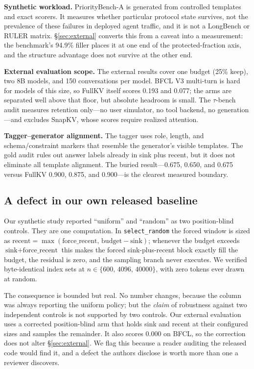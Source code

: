 \documentclass[10pt]{article}
\begin{document}
\textbf{Synthetic workload.}
PriorityBench-A is generated from controlled templates and exact scorers.  It
measures whether particular protocol state survives, not the prevalence of
these failures in deployed agent traffic, and it is not a LongBench or RULER
matrix.  \S\ref{sec:external} converts this from a caveat into a measurement:
the benchmark's 94.9\% filler places it at one end of the protected-fraction
axis, and the structure advantage does not survive at the other end.

\textbf{External evaluation scope.}
The external results cover one budget (25\% keep), two 8B models, and 150
conversations per model.  BFCL V3 multi-turn is hard for models of this size, so
FullKV itself scores 0.193 and 0.077; the arms are separated well above that
floor, but absolute headroom is small.  The $\tau$-bench audit measures retention
only---no user simulator, no tool backend, no generation---and excludes SnapKV,
whose scores require realized attention.

\textbf{Tagger--generator alignment.}
The tagger uses role, length, and schema/constraint markers that resemble the
generator's visible templates.  The gold audit rules out answer labels already
in sink plus recent, but it does not eliminate all template alignment.  The
buried result---0.675, 0.650, and 0.675 versus FullKV 0.900, 0.875, and
0.900---is the clearest measured boundary.

\subsection{A defect in our own released baseline}
\label{sec:random-defect}

Our synthetic study reported ``uniform'' and ``random'' as two position-blind
controls.  They are one computation.  In \texttt{select\_random} the forced
window is sized as $\text{recent} = \max(\text{force\_recent},\,
\text{budget} - \text{sink})$; whenever the budget exceeds $\text{sink} +
\text{force\_recent}$ this makes the forced sink-plus-recent block exactly fill
the budget, the residual is zero, and the sampling branch never executes.  We
verified byte-identical index sets at $n \in \{600,\,4096,\,40000\}$, with zero
tokens ever drawn at random.

The consequence is bounded but real.  No number changes, because the column was
always reporting the uniform policy; but the \emph{claim} of robustness against
two independent controls is not supported by two controls.  Our external
evaluation uses a corrected position-blind arm that holds sink and recent at
their configured sizes and samples the remainder.  It also scores 0.000 on BFCL,
so the correction does not alter \S\ref{sec:external}.  We flag this because a
reader auditing the released code would find it, and a defect the authors
disclose is worth more than one a reviewer discovers.
\end{document}
